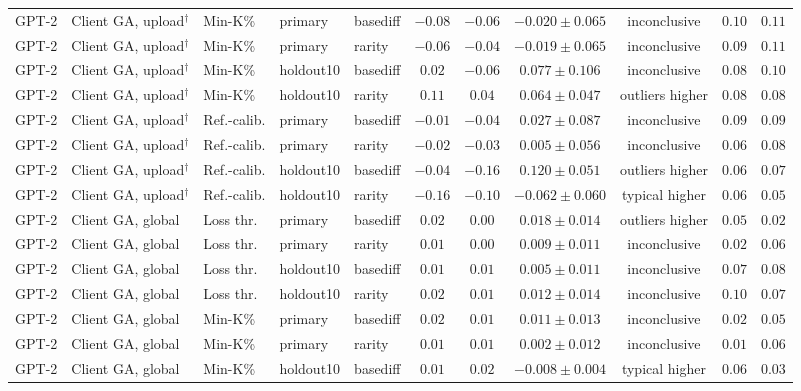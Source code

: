 {\begin{longtable}{@{\extracolsep{\fill}}lllllcccccc@{}}
GPT-2 & Client GA, upload$^{\dagger}$ & Min-K\% & primary & basediff & $-0.08$ & $-0.06$ & $-0.020 \pm 0.065$ & inconclusive & $0.10$ & $0.11$ \\
GPT-2 & Client GA, upload$^{\dagger}$ & Min-K\% & primary & rarity & $-0.06$ & $-0.04$ & $-0.019 \pm 0.065$ & inconclusive & $0.09$ & $0.11$ \\
GPT-2 & Client GA, upload$^{\dagger}$ & Min-K\% & holdout10 & basediff & $0.02$ & $-0.06$ & $0.077 \pm 0.106$ & inconclusive & $0.08$ & $0.10$ \\
GPT-2 & Client GA, upload$^{\dagger}$ & Min-K\% & holdout10 & rarity & $0.11$ & $0.04$ & $0.064 \pm 0.047$ & outliers higher & $0.08$ & $0.08$ \\
GPT-2 & Client GA, upload$^{\dagger}$ & Ref.-calib. & primary & basediff & $-0.01$ & $-0.04$ & $0.027 \pm 0.087$ & inconclusive & $0.09$ & $0.09$ \\
GPT-2 & Client GA, upload$^{\dagger}$ & Ref.-calib. & primary & rarity & $-0.02$ & $-0.03$ & $0.005 \pm 0.056$ & inconclusive & $0.06$ & $0.08$ \\
GPT-2 & Client GA, upload$^{\dagger}$ & Ref.-calib. & holdout10 & basediff & $-0.04$ & $-0.16$ & $0.120 \pm 0.051$ & outliers higher & $0.06$ & $0.07$ \\
GPT-2 & Client GA, upload$^{\dagger}$ & Ref.-calib. & holdout10 & rarity & $-0.16$ & $-0.10$ & $-0.062 \pm 0.060$ & typical higher & $0.06$ & $0.05$ \\
GPT-2 & Client GA, global & Loss thr. & primary & basediff & $0.02$ & $0.00$ & $0.018 \pm 0.014$ & outliers higher & $0.05$ & $0.02$ \\
GPT-2 & Client GA, global & Loss thr. & primary & rarity & $0.01$ & $0.00$ & $0.009 \pm 0.011$ & inconclusive & $0.02$ & $0.06$ \\
GPT-2 & Client GA, global & Loss thr. & holdout10 & basediff & $0.01$ & $0.01$ & $0.005 \pm 0.011$ & inconclusive & $0.07$ & $0.08$ \\
GPT-2 & Client GA, global & Loss thr. & holdout10 & rarity & $0.02$ & $0.01$ & $0.012 \pm 0.014$ & inconclusive & $0.10$ & $0.07$ \\
GPT-2 & Client GA, global & Min-K\% & primary & basediff & $0.02$ & $0.01$ & $0.011 \pm 0.013$ & inconclusive & $0.02$ & $0.05$ \\
GPT-2 & Client GA, global & Min-K\% & primary & rarity & $0.01$ & $0.01$ & $0.002 \pm 0.012$ & inconclusive & $0.01$ & $0.06$ \\
GPT-2 & Client GA, global & Min-K\% & holdout10 & basediff & $0.01$ & $0.02$ & $-0.008 \pm 0.004$ & typical higher & $0.06$ & $0.03$ \\

\end{longtable}}
